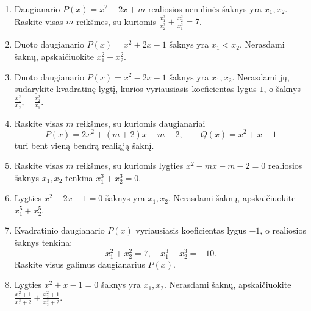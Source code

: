 \documentclass[11pt,a4paper]{article}
\begin{document}
\begin{enumerate}
\item \begin{minipage}[t]{\linewidth}Daugianario \(P(x)=x^{2}-2x+m\) realiosios nenulinės šaknys yra \(x_1,x_2\). Raskite visas \(m\) reikšmes, su kuriomis \mbox{\(\frac{x_1^2}{x_2^2}+\frac{x_2^2}{x_1^2}=7\)}.\end{minipage}
\item \begin{minipage}[t]{\linewidth}Duoto daugianario \(P(x)=x^{2}+2x-1\) šaknys yra \(x_1<x_2\). Nerasdami šaknų, apskaičiuokite \mbox{\(x_{1}^{2} - x_{2}^{2}\)}.\end{minipage}
\item \begin{minipage}[t]{\linewidth}Duoto daugianario \(P(x)=x^{2}-2x-1\) šaknys yra \(x_1,x_2\). Nerasdami jų, sudarykite kvadratinę lygtį, kurios vyriausiasis koeficientas lygus \(1\), o šaknys \mbox{\(\frac{x_{1}^{2}}{x_{2}},\quad \frac{x_{2}^{2}}{x_{1}}\)}.\end{minipage}
\item \begin{minipage}[t]{\linewidth}Raskite visas \(m\) reikšmes, su kuriomis daugianariai \[P(x)=2x^{2}+\left(m + 2\right)x+m - 2,\qquad Q(x)=x^{2}+x-1\] turi bent vieną bendrą realiąją šaknį.\end{minipage}
\item \begin{minipage}[t]{\linewidth}Raskite visas \(m\) reikšmes, su kuriomis lygties \(x^{2}-mx- m - 2=0\) realiosios šaknys \(x_1,x_2\) tenkina \mbox{\(x_1^3+x_2^3=0\)}.\end{minipage}
\item \begin{minipage}[t]{\linewidth}Lygties \(x^{2}-2x-1=0\) šaknys yra \(x_1,x_2\). Nerasdami šaknų, apskaičiuokite \mbox{\(x_{1}^{5} + x_{2}^{5}\)}.\end{minipage}
\item \begin{minipage}[t]{\linewidth}Kvadratinio daugianario \(P(x)\) vyriausiasis koeficientas lygus \(-1\), o realiosios šaknys tenkina: \[x_1^2+x_2^2=7,\quad x_1^3+x_2^3=-10.\] Raskite visus galimus daugianarius \(P(x)\).\end{minipage}
\item \begin{minipage}[t]{\linewidth}Lygties \(x^{2}+x-1=0\) šaknys yra \(x_1,x_2\). Nerasdami šaknų, apskaičiuokite \mbox{\(\frac{x_{1}^{2} + 1}{x_{1}^{3} + 2} + \frac{x_{2}^{2} + 1}{x_{2}^{3} + 2}\)}.\end{minipage}

\end{enumerate}
\end{document}
